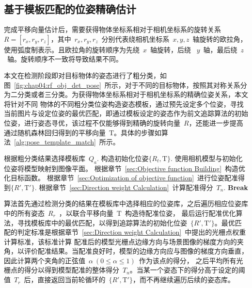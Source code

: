 \subsection{基于模板匹配的位姿精确估计}
\label{sec:template_pose_accuracy}
完成平移向量估计后，需要获得物体坐标系相对于相机坐标系的旋转关系~$R=[r_x, r_y, r_z]$，其中~$r_x,r_y,r_z$~分别代表绕相机坐标系~$x,y,z$~轴旋转的欧拉角，使用弧度制表示。且欧拉角的旋转顺序为先绕~$x$~轴旋转，后绕
~$y$~轴，最后绕~$z$~轴。旋转顺序不一致将导致结果不同。

本文在检测阶段即对目标物体的姿态进行了粗分类，如图~\ref{fig:chap04:rf_obj_det_pose}~所示，对于不同的目标物体，按照其对称关系分为二分类或者三分类。为获得物体坐标系相对于相机坐标系的精确位姿关系，本文将针对不同
物体的不同粗分类位姿构造姿态模板，通过预先设定多个位姿，寻找当前图片与设定位姿的最优匹配，即通过模板设定的姿态作为前文追踪算法的初始位姿，进行姿态寻优，该过程不仅能够得到精确的旋转向量~$R$，还能进一步提高
通过随机森林回归得到的平移向量~$\textrm{T}$。具体的步骤如算法~\ref{alg:pose_template_match}~所示。
\begin{algorithm}[H]
  \caption{[$R',\textrm{T}'$]=$Match(Q,\textrm{T},T_r,a)$}
  \label{alg:pose_template_match}
  \begin{algorithmic}[1]
    \State 根据粗分类结果选择模板库~$Q_a$.
      \State 构造初始化位姿$\{R_t, \textrm{T}\}$.
      \State 使用相机模型与初始化位姿将模型映射到图像平面。
      \State 根据章节~\ref{sec:Objective function Building}~构造优化目标函数。
      \State 根据章节~\ref{sec:Optimization of objective function}~进行位姿配准得到$\{R',\textrm{T}'\}$.
      \State 根据章节~\ref{sec:Direction weight Calculation}~计算配准得分~$T_n$.
        \State \textbf{Break}
      \EndIf
    \EndFor
    \\
  \end{algorithmic}
\end{algorithm}

算法首先通过检测分类的结果在模板库中选择相应的位姿库，之后遍历相应位姿库中的所有姿态~$R_r$~，以联合平移向量~$\textrm{T}$~构造待配准位姿，
最后运行配准优化算法，寻找模板库中的最优匹配，以得到追踪算法的初始化位姿~$\{R',\textrm{T}'\}$。最优匹配的判定标准是根据章节~\ref{sec:Direction weight Calculation}~中提出的光栅点权重计算标准，该标准计算
配准后的模型光栅点边缘方向与场景图像的梯度方向的夹角，以评价配准结果。当配准良好时，模型的边缘方向应与图像的梯度方向垂直，因此计算两个夹角的正弦值~$\alpha~ (0\leq \alpha \leq 1)$~作为该点的得分，
之后平均所有光栅点的得分以得到模型配准的整体得分~$T_n$。当某一个姿态下的得分高于设定的阈值~$T_r$~后，直接返回当前轮循环的~$\{R',\textrm{T}'\}$，而不再继续遍历后续的姿态库。

